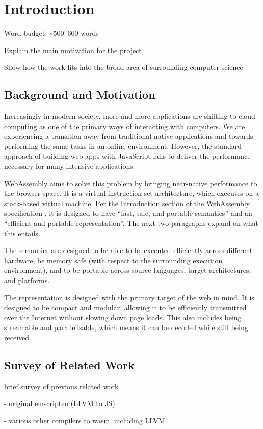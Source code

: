 \documentclass[00-main.tex]{subfiles}
\begin{document}
\chapter{Introduction}

\begin{Comment}
Word budget: \textasciitilde 500--600 words
\end{Comment}

\begin{Comment}
Explain the main motivation for the project

Show how the work fits into the broad area of surrounding computer science
\end{Comment}

\section{Background and Motivation}

Increasingly in modern society, more and more applications are shifting to cloud computing as one of the primary ways of interacting with computers.
We are experiencing a transition away from traditional native applications and towards performing the same tasks in an online environment.
However, the standard approach of building web apps with JavaScript fails to deliver the performance necessary for many intensive applications.

WebAssembly aims to solve this problem by bringing near-native performance to the browser space.
It is a virtual instruction set architecture, which executes on a stack-based virtual machine.
Per the Introduction section of the WebAssembly specification , it is designed to have ``fast, safe, and portable semantics'' and an ``efficient and portable representation''.
The next two paragraphs expand on what this entails.

The semantics are designed to be able to be executed efficiently across different hardware, be memory safe (with respect to the surrounding execution environment), and to be portable across source languages, target architectures, and platforms.

The representation is designed with the primary target of the web in mind.
It is designed to be compact and modular, allowing it to be efficiently transmitted over the Internet without slowing down page loads.
This also includes being streamable and parallelisable, which means it can be decoded while still being received.



\section{Survey of Related Work}

\begin{Comment}
brief survey of previous related work

- original emscripten (LLVM to JS)

- various other compilers to wasm, including LLVM
\end{Comment}
\end{document}
